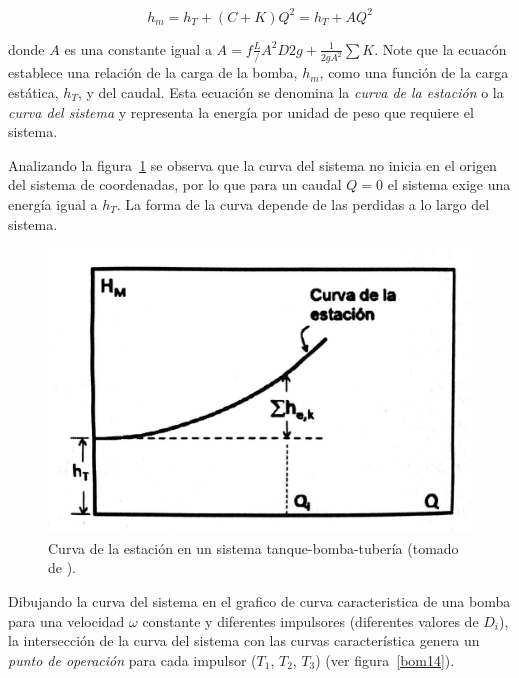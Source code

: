 \documentclass[11pt, oneside]{article}
\begin{document}
\begin{equation}
h_m = h_T + (C+K)Q^2 = h_T +A Q^2
\label{boma15}
\end{equation}

donde $A$ es una constante igual a $A = f\frac{L}/{A^2 D 2 g} + \frac{1}{2g A^2}\sum K$. Note que la ecuac\'on establece una relaci\'on de la carga de la bomba, $h_m$, como una funci\'on de la carga est\'atica, $h_T$, y del caudal. Esta ecuaci\'on se denomina la \emph{curva de la estaci\'on} o la \emph{curva del sistema} y representa la energ\'ia por unidad de peso que requiere el sistema. 

Analizando la figura~\ref{bom13} se observa que la curva del sistema no inicia en el origen del sistema de coordenadas, por lo que para un caudal $Q=0$ el sistema exige una energ\'ia igual a $h_T$. La forma de la curva depende de las perdidas a lo largo del sistema. 

\begin{figure}[h]
\centering
\includegraphics[width=12cm]{./figs/bom13.jpeg}
\caption{Curva de la estaci\'on en un sistema tanque-bomba-tuber\'ia (tomado de \cite{agudelo2011mecanica}).} 
\label{bom13}
\end{figure}

Dibujando la curva del sistema en el grafico de curva caracteristica de una bomba para una velocidad $\omega$ constante y diferentes impulsores (diferentes valores de $D_i$), la intersecci\'on de la curva del sistema con las curvas caracter\'istica genera un \emph{punto de operaci\'on} para cada impulsor ($T_1$, $T_2$, $T_3$) (ver figura~\ref{bom14}).
\end{document}
